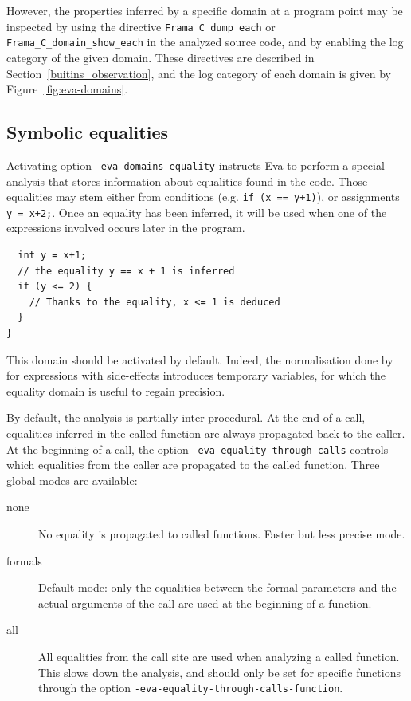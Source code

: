 \documentclass[web]{frama-c-book}
\newcommand{\Eva}{\textsf{Eva}}
\begin{document}
However, the properties inferred by a specific domain at a program point may be
inspected by using the directive \lstinline+Frama_C_dump_each+ or
\lstinline+Frama_C_domain_show_each+ in the analyzed source code, and by
enabling the log category of the given domain. These directives are described
in Section~\ref{buitins_observation}, and the log category of each domain
is given by Figure~\ref{fig:eva-domains}.

\subsection{Symbolic equalities}
\label{sec:symbolic-equalities}

Activating option \texttt{-eva-domains equality} instructs
\Eva{} to perform a special analysis that stores information
about equalities found in the code. Those equalities may stem either
from conditions (e.g. \texttt{if (x == y+1)}), or assignments
\texttt{y = x+2;}. Once an equality has been inferred, it will
be used when one of the expressions involved occurs later in the program.


\begin{lstlisting}
  int y = x+1;
  // the equality y == x + 1 is inferred
  if (y <= 2) {
    // Thanks to the equality, x <= 1 is deduced
  }
}
\end{lstlisting}

This domain should be activated by default. Indeed, the normalisation
done by \FramaC for expressions with side-effects introduces temporary
variables, for which the equality domain is useful to regain
precision.

By default, the analysis is partially inter-procedural.
At the end of a call, equalities inferred in the called function are always
propagated back to the caller.
At the beginning of a call, the option \verb+-eva-equality-through-calls+
controls which equalities from the caller are propagated to the called function.
Three global modes are available:
\begin{description}
\item[none] No equality is propagated to called functions. Faster but less
  precise mode.
\item[formals] Default mode: only the equalities between the formal parameters
  and the actual arguments of the call are used at the beginning
  of a function.
\item[all] All equalities from the call site are used when analyzing a called
  function.  This slows down the analysis, and should only be set for specific
  functions through the option \verb+-eva-equality-through-calls-function+.
\end{description}
\end{document}
